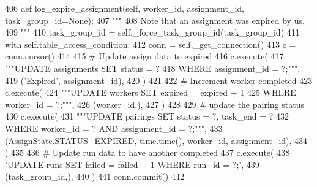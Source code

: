 \begin{DoxyCode}
406     \textcolor{keyword}{def }log\_expire\_assignment(self, worker\_id, assignment\_id, task\_group\_id=None):
407         \textcolor{stringliteral}{"""}
408 \textcolor{stringliteral}{        Note that an assignment was expired by us.}
409 \textcolor{stringliteral}{        """}
410         task\_group\_id = self.\_force\_task\_group\_id(task\_group\_id)
411         with self.table\_access\_condition:
412             conn = self.\_get\_connection()
413             c = conn.cursor()
414 
415             \textcolor{comment}{# Update assign data to expired}
416             c.execute(
417                 \textcolor{stringliteral}{"""UPDATE assignments SET status = ?}
418 \textcolor{stringliteral}{                         WHERE assignment\_id = ?;"""},
419                 (\textcolor{stringliteral}{'Expired'}, assignment\_id),
420             )
421 
422             \textcolor{comment}{# Increment worker completed}
423             c.execute(
424                 \textcolor{stringliteral}{"""UPDATE workers SET expired = expired + 1}
425 \textcolor{stringliteral}{                         WHERE worker\_id = ?;"""},
426                 (worker\_id,),
427             )
428 
429             \textcolor{comment}{# update the pairing status}
430             c.execute(
431                 \textcolor{stringliteral}{"""UPDATE pairings SET status = ?, task\_end = ?}
432 \textcolor{stringliteral}{                         WHERE worker\_id = ? AND assignment\_id = ?;"""},
433                 (AssignState.STATUS\_EXPIRED, time.time(), worker\_id, assignment\_id),
434             )
435 
436             \textcolor{comment}{# Update run data to have another completed}
437             c.execute(
438                 \textcolor{stringliteral}{'UPDATE runs SET failed = failed + 1 WHERE run\_id = ?;'},
439                 (task\_group\_id,),
440             )
441             conn.commit()
442 
\end{DoxyCode}
\mbox{\label{classparlai_1_1mturk_1_1core_1_1dev_1_1mturk__data__handler_1_1MTurkDataHandler_a520efb5a04ffab6b689c0562997f76e0}} 
